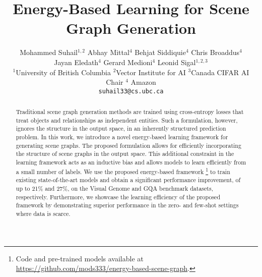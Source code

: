 \documentclass[final]{cvpr}
\begin{document}
\title{Energy-Based Learning for Scene Graph Generation}

\author{
Mohammed Suhail$^{1,2}$ \qquad Abhay Mittal$^{4}$ \qquad Behjat Siddiquie$^{4}$  \qquad Chris Broaddus$^{4}$ \\ Jayan Eledath$^{4}$  \qquad Gerard Medioni$^{4}$ \qquad Leonid Sigal$^{1,2,3}$\\
$^1$University of British Columbia \qquad
$^2$Vector Institute for AI \qquad
$^3$Canada CIFAR AI Chair \qquad
$^4$ Amazon \\
{\tt\small suhail33@cs.ubc.ca}    \\   
}

\maketitle
\begin{abstract}
Traditional scene graph generation methods are trained using cross-entropy losses that treat objects and relationships as independent entities. Such a formulation, however, ignores the structure in the output space, in an inherently structured prediction problem.
In this work, we introduce a novel energy-based learning framework for generating scene graphs. The proposed formulation allows for efficiently incorporating the structure of scene graphs in the output space. This additional constraint in the learning framework acts as an inductive bias and allows models to learn efficiently from a small number of labels. 
We use the proposed energy-based framework \footnote{Code and pre-trained models available at \url{https://github.com/mods333/energy-based-scene-graph}.} to train existing state-of-the-art models and obtain a significant performance improvement, of up to 21\% and 27\%, on the Visual Genome \cite{krishna2017visual} and GQA \cite{hudson2018gqa} benchmark datasets, respectively. Furthermore, we showcase the learning efficiency of the proposed framework by demonstrating superior performance in the zero- and few-shot settings where data is scarce.
\end{abstract}
\end{document}
